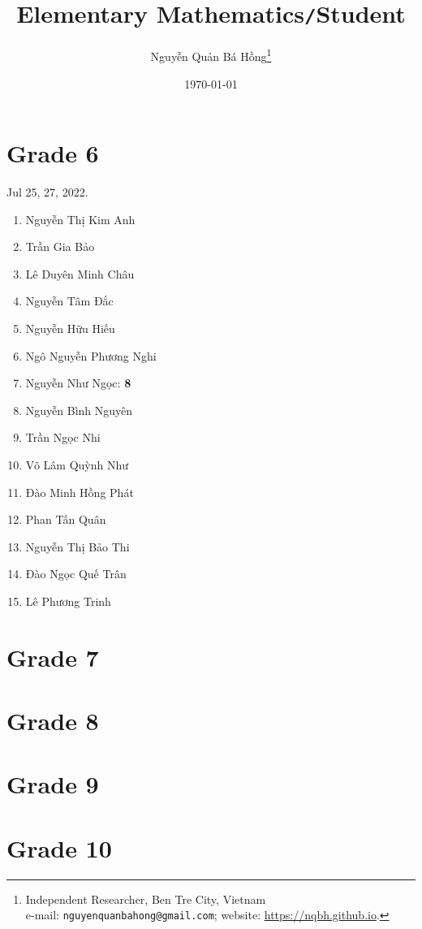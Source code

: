 \documentclass{article}
\title{Elementary Mathematics\texttt{/}Student}
\author{\selectlanguage{vietnamese} Nguyễn Quản Bá Hồng\footnote{Independent Researcher, Ben Tre City, Vietnam\\e-mail: \texttt{nguyenquanbahong@gmail.com}; website: \url{https://nqbh.github.io}.}}
\date{\today}
\numberwithin{equation}{section}
\begin{document}
\maketitle
{}
\begin{abstract}
	
\end{abstract}

\tableofcontents
{}


\section{Grade 6}
Jul 25, 27, 2022.
\begin{enumerate}
	\item Nguyễn Thị Kim Anh
	\item Trần Gia Bảo
	\item Lê Duyên Minh Châu
	\item Nguyễn Tâm Đắc
	\item Nguyễn Hữu Hiếu
	\item Ngô Nguyễn Phương Nghi
	\item Nguyễn Như Ngọc: \textbf{8}
	\item Nguyễn Bình Nguyên
	\item Trần Ngọc Nhi
	\item Võ Lâm Quỳnh Như
	\item Đào Minh Hồng Phát
	\item Phan Tấn Quân
	\item Nguyễn Thị Bảo Thi
	\item Đào Ngọc Quế Trân
	\item Lê Phương Trinh
\end{enumerate}

\section{Grade 7}

\section{Grade 8}

\section{Grade 9}

\section{Grade 10}
\end{document}
